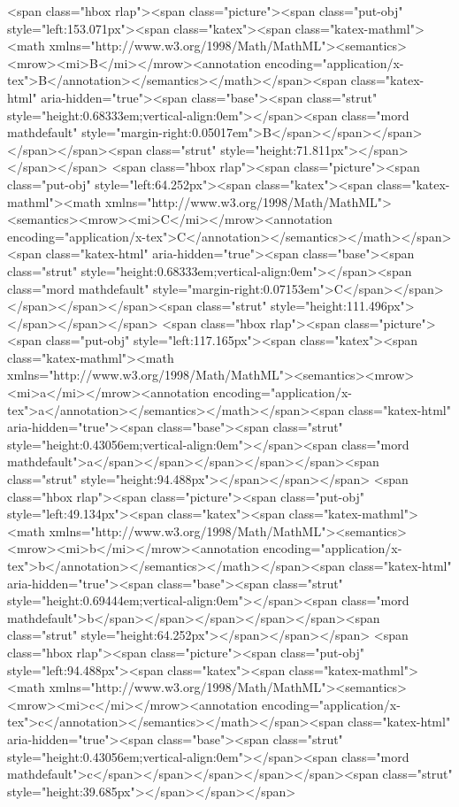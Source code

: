 <span class="hbox rlap"><span class="picture"><span class="put-obj" style="left:153.071px"><span class="katex"><span class="katex-mathml"><math xmlns="http://www.w3.org/1998/Math/MathML"><semantics><mrow><mi>B</mi></mrow><annotation encoding="application/x-tex">B</annotation></semantics></math></span><span class="katex-html" aria-hidden="true"><span class="base"><span class="strut" style="height:0.68333em;vertical-align:0em"></span><span class="mord mathdefault" style="margin-right:0.05017em">B</span></span></span></span></span><span class="strut" style="height:71.811px"></span></span></span>
<span class="hbox rlap"><span class="picture"><span class="put-obj" style="left:64.252px"><span class="katex"><span class="katex-mathml"><math xmlns="http://www.w3.org/1998/Math/MathML"><semantics><mrow><mi>C</mi></mrow><annotation encoding="application/x-tex">C</annotation></semantics></math></span><span class="katex-html" aria-hidden="true"><span class="base"><span class="strut" style="height:0.68333em;vertical-align:0em"></span><span class="mord mathdefault" style="margin-right:0.07153em">C</span></span></span></span></span><span class="strut" style="height:111.496px"></span></span></span>
<span class="hbox rlap"><span class="picture"><span class="put-obj" style="left:117.165px"><span class="katex"><span class="katex-mathml"><math xmlns="http://www.w3.org/1998/Math/MathML"><semantics><mrow><mi>a</mi></mrow><annotation encoding="application/x-tex">a</annotation></semantics></math></span><span class="katex-html" aria-hidden="true"><span class="base"><span class="strut" style="height:0.43056em;vertical-align:0em"></span><span class="mord mathdefault">a</span></span></span></span></span><span class="strut" style="height:94.488px"></span></span></span>
<span class="hbox rlap"><span class="picture"><span class="put-obj" style="left:49.134px"><span class="katex"><span class="katex-mathml"><math xmlns="http://www.w3.org/1998/Math/MathML"><semantics><mrow><mi>b</mi></mrow><annotation encoding="application/x-tex">b</annotation></semantics></math></span><span class="katex-html" aria-hidden="true"><span class="base"><span class="strut" style="height:0.69444em;vertical-align:0em"></span><span class="mord mathdefault">b</span></span></span></span></span><span class="strut" style="height:64.252px"></span></span></span>
<span class="hbox rlap"><span class="picture"><span class="put-obj" style="left:94.488px"><span class="katex"><span class="katex-mathml"><math xmlns="http://www.w3.org/1998/Math/MathML"><semantics><mrow><mi>c</mi></mrow><annotation encoding="application/x-tex">c</annotation></semantics></math></span><span class="katex-html" aria-hidden="true"><span class="base"><span class="strut" style="height:0.43056em;vertical-align:0em"></span><span class="mord mathdefault">c</span></span></span></span></span><span class="strut" style="height:39.685px"></span></span></span>
